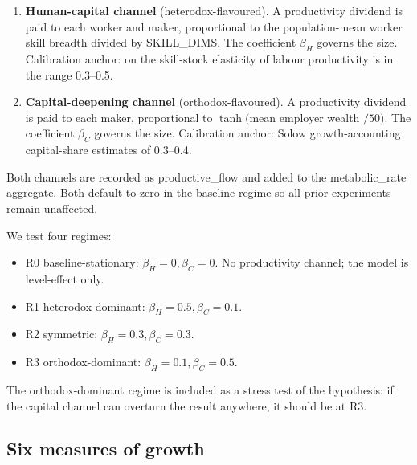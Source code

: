 \documentclass[11pt]{article}
\begin{document}
\begin{enumerate}
\item \textbf{Human-capital channel} (heterodox-flavoured).  A
productivity dividend is paid to each worker and maker, proportional
to the population-mean worker skill breadth divided by SKILL\_DIMS.
The coefficient $\beta_H$ governs the size.  Calibration anchor:
\citet{hanushek2012better} on the skill-stock elasticity of labour
productivity is in the range 0.3--0.5.

\item \textbf{Capital-deepening channel} (orthodox-flavoured).  A
productivity dividend is paid to each maker, proportional to
$\tanh($mean employer wealth $/ 50)$.  The coefficient $\beta_C$
governs the size.  Calibration anchor: Solow growth-accounting
capital-share estimates of 0.3--0.4.
\end{enumerate}

Both channels are recorded as productive\_flow and added to the
metabolic\_rate aggregate.  Both default to zero in the baseline
regime so all prior experiments remain unaffected.

We test four regimes:

\begin{itemize}
\item R0 baseline-stationary: $\beta_H = 0, \beta_C = 0$.  No
productivity channel; the model is level-effect only.
\item R1 heterodox-dominant: $\beta_H = 0.5, \beta_C = 0.1$.
\item R2 symmetric: $\beta_H = 0.3, \beta_C = 0.3$.
\item R3 orthodox-dominant: $\beta_H = 0.1, \beta_C = 0.5$.
\end{itemize}

The orthodox-dominant regime is included as a stress test of the
hypothesis: if the capital channel can overturn the result anywhere,
it should be at R3.

\subsection{Six measures of growth}
\end{document}
